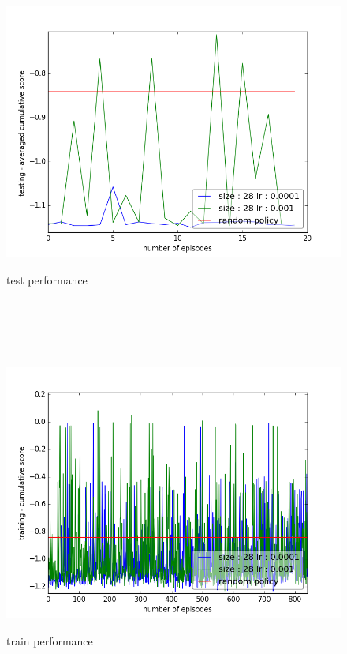 \documentclass{report}
\begin{document}
\begin{figure}[H]
\begin{minipage}[c]{.49\linewidth}
	\centering
	\includegraphics[width = \linewidth]{plots/b3/Pong-v3/testScoreMean.png}
	\caption{test performance}
    \end{minipage}
    \hfill%
\begin{minipage}[c]{.49\linewidth}
    \centering 
    \includegraphics[width = \linewidth]{plots/b3/Pong-v3/trainScore.png}
	\caption{train performance}
\end{minipage}
\end{figure}
\end{document}

